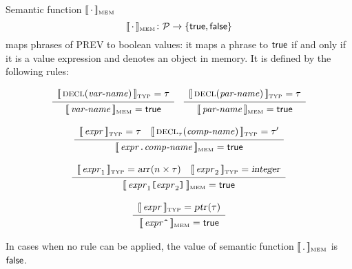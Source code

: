\documentclass[10pt]{article}
\begin{document}
Semantic function $ [\![\,\cdot\,]\!]_{\mbox{\tiny MEM}} $
$$ [\![\,\cdot\,]\!]_{\mbox{\tiny MEM}} \colon {\cal P} \rightarrow \{ \mbox{\textsf{true}},\mbox{\textsf{false}} \} $$
maps phrases of PREV to boolean values: it maps a phrase to $ \mbox{\textsf{true}} $ if and only if it is a value expression and denotes an object in memory.  It is defined by the following rules:

$$ \begin{array}{c}
   \typattr{\mbox{\textsc{decl}}(\nont{var-name})} = \tau
   \\[2pt]\hline\\[-10pt]
   \memattr{\nont{var-name}} = \mbox{\textsf{true}}
   \end{array}
  \quad
   \begin{array}{c}
   \typattr{\mbox{\textsc{decl}}(\nont{par-name})} = \tau
   \\[2pt]\hline\\[-10pt]
   \memattr{\nont{par-name}} = \mbox{\textsf{true}}
   \end{array} $$
   
$$ \begin{array}{c}
   [\![\,\mbox{\textit{expr}}\,]\!]_{\mbox{\tiny TYP}} = \tau \quad [\![\,\mbox{\textsc{decl}}_\tau(\mbox{\textit{comp-name}})\,]\!]_{\mbox{\tiny TYP}} = \tau'
   \\[2pt]\hline\\[-10pt]
   [\![\,\mbox{\textit{expr}}\mbox{\texttt{.}}\mbox{\textit{comp-name}}\,]\!]_{\mbox{\tiny MEM}} = \mbox{\textsf{true}}
   \end{array} $$

$$ \begin{array}{c}
   [\![\,\mbox{\textit{expr}}_1\,]\!]_{\mbox{\tiny TYP}} = \mbox{\textsl{arr}}(n\times\tau) \quad 
   [\![\,\mbox{\textit{expr}}_2\,]\!]_{\mbox{\tiny TYP}} = \mbox{\textsl{integer}}
   \\[2pt]\hline\\[-10pt]
   [\![\,\mbox{\textit{expr}}_1\mbox{\texttt{[}}\mbox{\textit{expr}}_2\mbox{\texttt{]}}\,]\!]_{\mbox{\tiny MEM}} = \mbox{\textsf{true}}
   \end{array} $$

$$ \begin{array}{c}
   [\![\,\mbox{\textit{expr}}\,]\!]_{\mbox{\tiny TYP}} = \mbox{\textsl{ptr}}(\tau)
   \\[2pt]\hline\\[-10pt]
   [\![\,\mbox{\textit{expr}}\mbox{\texttt{\^}}\,]\!]_{\mbox{\tiny MEM}} = \mbox{\textsf{true}}
   \end{array} $$

In cases when no rule can be applied, the value of semantic function $ [\![\,.\,]\!]_{\mbox{\tiny MEM}} $ is $ \mbox{\textsf{false}} $.
\end{document}
